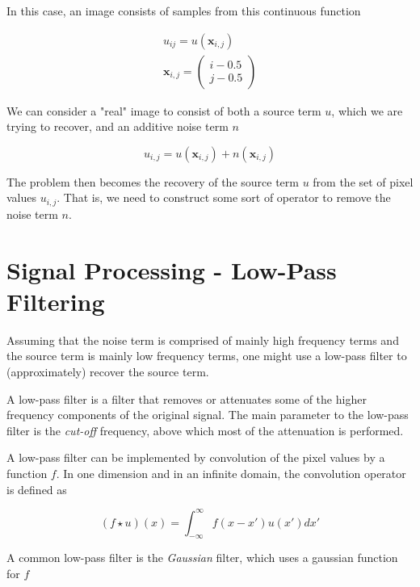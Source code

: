 \documentclass[11pt,a4paper,noindent]{article}
\begin{document}
In this case, an image consists of samples from this continuous function

\begin{align}
u_{ij} = u(\mathbf{x}_{i,j}) \\
\mathbf{x}_{i,j} = \begin{pmatrix} i-0.5 \\ j-0.5 \end{pmatrix}
\end{align}

We can consider a "real" image to consist of both a source term $u$, which we are trying to recover, and an additive noise term $n$

\begin{equation}
u_{i,j} = u(\mathbf{x}_{i,j}) + n(\mathbf{x}_{i,j})
\end{equation}

The problem then becomes the recovery of the source term $u$ from the set of pixel values $u_{i,j}$. That is, we need to construct some sort of operator to remove the noise term $n$.

\section{Signal Processing - Low-Pass Filtering}

Assuming that the noise term is comprised of mainly high frequency terms and the source term is mainly low frequency terms, one might use a low-pass filter to (approximately) recover the source term.

A low-pass filter is a filter that removes or attenuates some of the higher frequency components of the original signal. The main parameter to the low-pass filter is the \emph{cut-off} frequency, above which most of the attenuation is performed.

A low-pass filter can be implemented by convolution of the pixel values by a function $f$. In one dimension and in an infinite domain, the convolution operator is defined as

\begin{equation}
(f \star u)(x) = \int_{-\infty}^{\infty} f(x-x')u(x')dx'
\end{equation}

%

A common low-pass filter is the \emph{Gaussian} filter, which uses a gaussian function for $f$
\end{document}
